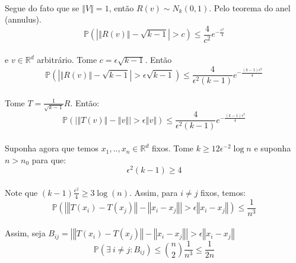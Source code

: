 \paragraph{}Segue do fato que se $\left\Vert V \right\Vert = 1$, então $R(v) \sim N_k(0,1)$. Pelo teorema do anel (annulus).
\begin{equation*}
    \mathbb{P}(\left\vert \left\Vert R(v) \right\Vert - \sqrt{k-1} \right\vert > c) \leq \frac{4}{c^2}e^{-\frac{c^2}{4}}
\end{equation*}
\paragraph{}e $v \in \mathbb{R}^d$ arbitrário. Tome $c = \epsilon\sqrt{k-1}$. Então
\begin{equation*}
    \mathbb{P}(\left\vert \left\Vert R(v) \right\Vert - \sqrt{k-1} \right\vert > \epsilon\sqrt{k-1}) \leq \frac{4}{\epsilon^2(k-1)}e^{-\frac{(k-1)\epsilon^2}{4}}
\end{equation*}
\paragraph{}Tome $T=\frac{1}{\sqrt{k-1}}R$. Então:
\begin{equation*}
    \mathbb{P}(\left\vert \left\Vert T(v) \right\Vert - \left\Vert v \right\Vert \right\vert > \epsilon\left\Vert v \right\Vert) \leq \frac{4}{\epsilon^2(k-1)}e^{-\frac{(k-1)\epsilon^2}{4}}
\end{equation*}
\paragraph{}Suponha agora que temos $x_1,..,x_n \in \mathbb{R}^d$ fixos. Tome $k \geq 12\epsilon^{-2}\log{n}$ e suponha $n>n_0$ para que:
\begin{equation*}
    \epsilon^2(k-1) \geq 4
\end{equation*}
\paragraph{}Note que $(k-1)\frac{\epsilon^2}{4} \geq 3\log(n)$. Assim, para $i \neq j$ fixos, temos:
\begin{equation*}
    \mathbb{P}(\left\vert \left\Vert T(x_i) - T(x_j) \right\Vert - \left\Vert x_i - x_j \right\Vert \right\vert > \epsilon\left\Vert x_i - x_j \right\Vert) \leq \frac{1}{n^3}
\end{equation*}
\paragraph{}Assim, seja $B_{ij} = \left\vert \left\Vert T(x_i) - T(x_j) \right\Vert - \left\Vert x_i - x_j \right\Vert \right\vert > \epsilon\left\Vert x_i - x_j \right\Vert$
\begin{equation*}
    \mathbb{P}(\exists\> i \neq j : B_{ij}) \leq \binom{n}{2}\frac{1}{n^3} \leq \frac{1}{2n}
\end{equation*}
